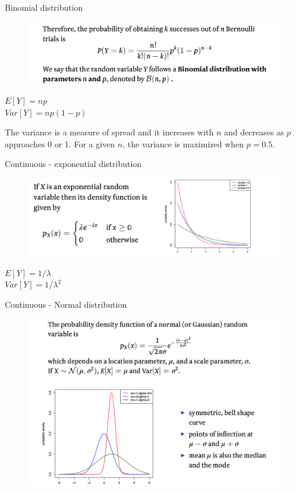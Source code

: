 \documentclass{beamer}
\begin{document}
\begin{frame}{Binomial distribution}
	\begin{figure}
                \includegraphics[width=0.9\linewidth]{binomial.png}
        \end{figure}
	$E[Y]=np$\\
	$Var[Y]=np(1-p)$

	The variance is a measure of spread and it increases with $n$ and
	decreases as $p$ approaches 0 or 1. For a given $n$, the variance is
	maximized when $p = 0.5$.

\end{frame}

\begin{frame}{Continuous - exponential distribution}
	\begin{figure}
                \includegraphics[width=0.9\linewidth]{exp.png}
        \end{figure}
	$E[Y]=1 / \lambda$\\
        $Var[Y]= 1 / \lambda^2$
\end{frame}

\begin{frame}{Continuous - Normal distribution}
	\begin{figure}
                \includegraphics[width=0.8\linewidth]{normal.png}
        \end{figure}
\end{frame}
\end{document}
